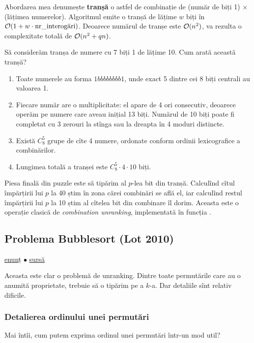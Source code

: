 \documentclass[../main.tex]{subfiles}
\begin{document}
Abordarea mea denumește \textbf{tranșă} o astfel de combinație de (număr de biți 1) × (lățimea numerelor). Algoritmul emite o tranșă de lățime $w$ biți în $\mathcal{O}(1 + w \cdot \text{nr\_interogări})$. Deoarece numărul de tranșe este $\mathcal{O}(n^2)$, va rezulta o complexitate totală de $\mathcal{O}(n^2 + qn)$.

Să considerăm tranșa de numere cu 7 biți 1 de lățime 10. Cum arată această tranșă?

\begin{enumerate}
  \item Toate numerele au forma $1bbbbbbbb1$, unde exact 5 dintre cei 8 biți centrali au valoarea 1.
  \item Fiecare număr are o multiplicitate: el apare de 4 ori consecutiv, deoarece operăm pe numere care aveau inițial 13 biți. Numărul de 10 biți poate fi completat cu 3 zerouri la stînga sau la dreapta în 4 moduri distincte.
  \item Există $C_8^5$ grupe de cîte 4 numere, ordonate conform ordinii lexicografice a combinărilor.
  \item Lungimea totală a tranșei este $C_8^5 \cdot  4 \cdot 10$ biți.
\end{enumerate}

Piesa finală din puzzle este să tipărim al $p$-lea bit din tranșă. Calculînd cîtul împărțirii lui $p$ la 40 știm în zona cărei combinări se află el, iar calculînd restul împărțirii lui $p$ la 10 știm al cîtelea bit din combinare îl dorim. Aceasta este o operație clasică de \textit{combination unranking}, implementată în funcția .

\subsection{Problema Bubblesort (Lot 2010)}
\label{problem:bubblesort}

\href{https://kilonova.ro/problems/2270}{enunț}
$\bullet$
\hyperref[code:bubblesort]{sursă}

Aceasta este clar o problemă de unranking. Dintre toate permutările care au o anumită proprietate, trebuie să o tipărim pe a $k$-a. Dar detaliile sînt relativ dificile.

\subsubsection*{Detalierea ordinului unei permutări}

Mai întîi, cum putem exprima ordinul unei permutări într-un mod util?
\end{document}
